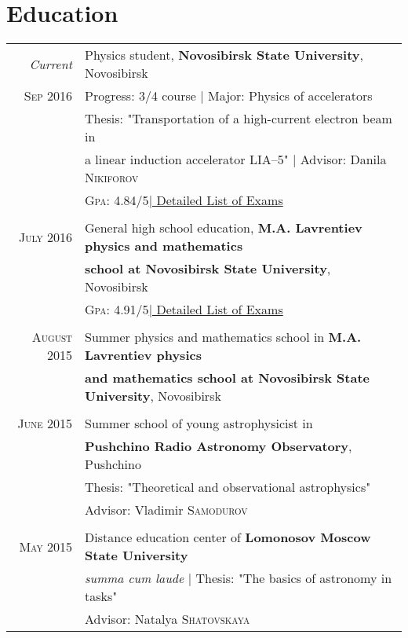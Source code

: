 \documentclass[a4paper,12pt]{article}
\begin{document}
\section{Education}
\begin{tabular}{rl}	
\emph{Current} & Physics student, \textbf{Novosibirsk State University}, Novosibirsk\\
\textsc{Sep} 2016 & Progress: 3/4 course | Major: Physics of accelerators\\
& Thesis: "Transportation of a high-current electron beam in \\& a linear induction accelerator LIA–5" | \small Advisor: Danila \textsc{Nikiforov}\\
&\normalsize \textsc{Gpa}: 4.84/5\hyperlink{nsu}{\hfill | \footnotesize Detailed List of Exams}\\&\\
\textsc{July} 2016 & General high school education, \textbf{M.A. Lavrentiev physics and mathematics} \\& \textbf{school at Novosibirsk State University}, Novosibirsk\\
&\normalsize \textsc{Gpa}: 4.91/5\hyperlink{school}{\hfill| \footnotesize Detailed List of Exams}\\&\\
\textsc{August} 2015& Summer physics and mathematics school in \textbf{M.A. Lavrentiev physics} \\& \textbf{and mathematics school at Novosibirsk State University}, Novosibirsk\\&\\
\textsc{June} 2015& Summer school of young astrophysicist in\\&  \textbf{Pushchino Radio Astronomy Observatory}, Pushchino\\
& Thesis: "Theoretical and observational astrophysics" \\
& \small Advisor: Vladimir \textsc{Samodurov}\\&\\
\textsc{May} 2015& Distance education center of \textbf{Lomonosov Moscow State University}
\\
& \small\emph{summa cum laude} | Thesis: "The basics of astronomy in tasks" \\
& \small Advisor: Natalya \textsc{Shatovskaya}\\
\end{tabular}

\end{document}
